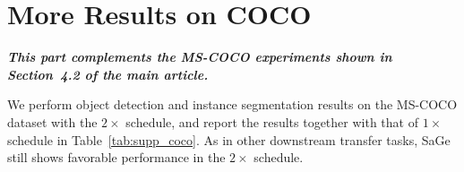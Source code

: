 \documentclass[10pt,twocolumn,letterpaper]{article}
\begin{document}
\section{More Results on COCO}

\textbf{\textit{This part complements the MS-COCO experiments shown in Section~4.2 of the main article.}}

We perform object detection and instance segmentation results on the MS-COCO dataset with the $2\times$ schedule, and report the results together with that of $1\times$ schedule in Table~\ref{tab:supp_coco}. As in other downstream transfer tasks, SaGe still shows favorable performance in the $2\times$ schedule.
\end{document}
